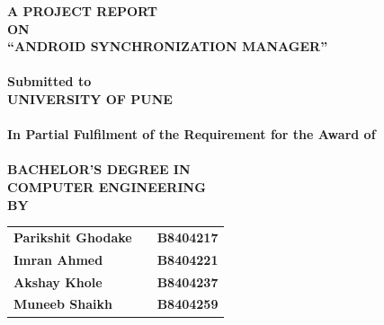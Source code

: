 \newpage
\begin{center}
\thispagestyle{empty}
\Large{\textbf{A PROJECT REPORT\\ON}}\\[0.7cm]
\Large{\textsc {\textbf{``ANDROID SYNCHRONIZATION MANAGER''}}}\\[0.5cm]
\Large{\textbf{\\Submitted to}}
\LARGE{\textbf{\\UNIVERSITY OF PUNE\\}}
\large{\textbf{\\In Partial Fulfilment of the Requirement for the Award of\\}}
\LARGE{\textbf{\\BACHELOR'S DEGREE IN\\COMPUTER ENGINEERING}}
\vspace{0.5cm}
\Large{\textbf{\\BY}}\\[0.5cm]
\begin{table}[h]
\centering
\Large{
\begin{tabular}{>{\bfseries}lc>{\bfseries}r}
Parikshit Ghodake & & B8404217\\Imran Ahmed & & B8404221\\Akshay Khole & & B8404237\\Muneeb Shaikh & & B8404259\\
\end{tabular}}
\end{table}


\end{center}
